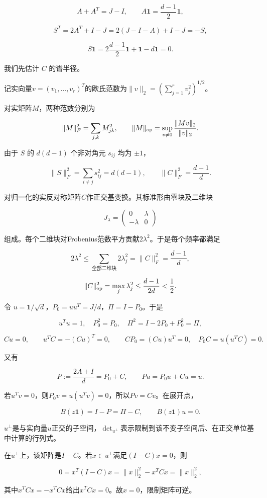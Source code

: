 \documentclass[11pt,a4paper]{article}
\begin{document}
\[
A+A^T=J-I,\qquad
A\mathbf1=\frac{d-1}{2}\mathbf1,
\]

\[
S^T=2A^T+I-J
=2(J-I-A)+I-J=-S,
\]

\[
S\mathbf1
=2\frac{d-1}{2}\mathbf1+\mathbf1-d\mathbf1=0.
\]

我们先估计 \(C\) 的谱半径。

记实向量\(v=(v_1,\ldots,v_r)^T\)的欧氏范数为\(\|v\|_2=(\sum_{j=1}^r v_j^2)^{1/2}\)。

对实矩阵\(M\)，两种范数分别为

\[
\|M\|_F^2=\sum_{j,k}M_{jk}^2,\qquad
\|M\|_{\rm op}=\sup_{v\ne0}\frac{\|Mv\|_2}{\|v\|_2}.
\]

由于 \(S\) 的 \(d(d-1)\) 个非对角元 \(s_{ij}\) 均为 \(\pm1\)，

\[
\|S\|_F^2=\sum_{i\ne j}s_{ij}^2=d(d-1),
\qquad \|C\|_F^2=\frac{d-1}{d}.
\]

对归一化的实反对称矩阵\(C\)作正交基变换。其标准形由零块及二维块

\[
J_\lambda=\begin{pmatrix}0&\lambda\\-\lambda&0\end{pmatrix}
\]

组成。每个二维块对Frobenius范数平方贡献\(2\lambda^2\)。于是每个频率都满足

\[
2\lambda^2\le\sum_{\text{全部二维块}}2\lambda_j^2
=\|C\|_F^2=\frac{d-1}{d},
\]

\[
\|C\|_{\rm op}^2=\max_j\lambda_j^2
\le\frac{d-1}{2d}<\frac12.
\]

令 \(u=\mathbf1/\sqrt d\)，\(P_0=uu^T=J/d\)，\(\Pi=I-P_0\)。于是

\[
u^Tu=1,\quad P_0^2=P_0,\quad
\Pi^2=I-2P_0+P_0^2=\Pi,
\]

\[
Cu=0,\qquad u^TC=-(Cu)^T=0,
\qquad CP_0=(Cu)u^T=0,\quad P_0C=u(u^TC)=0.
\]

又有

\[
P:=\frac{2A+I}{d}=P_0+C,\qquad
Pu=P_0u+Cu=u.
\]

若\(u^Tv=0\)，则\(P_0v=u(u^Tv)=0\)，所以\(Pv=Cv\)。在展开点，

\[
B(z\mathbf1)=I-P=\Pi-C,\qquad
B(z\mathbf1)u=0.
\]

\(u^\perp\)是与实向量\(u\)正交的子空间，\(\det_{u^\perp}\)表示限制到该不变子空间后、在正交单位基中计算的行列式。

在\(u^\perp\)上，该矩阵是\(I-C\)。若\(x\in u^\perp\)满足\((I-C)x=0\)，则

\[
0=x^T(I-C)x=\|x\|_2^2-x^TCx=\|x\|_2^2,
\]

其中\(x^TCx=-x^TCx\)给出\(x^TCx=0\)。故\(x=0\)，限制矩阵可逆。
\end{document}
